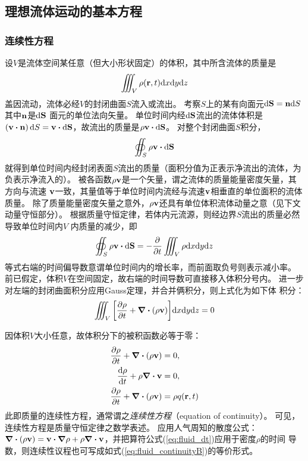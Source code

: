 \documentclass[UTF8]{ctexbook}
\begin{document}
\subsection{理想流体运动的基本方程}
\subsubsection{连续性方程}
设$V$是流体空间某任意（但大小形状固定）的体积，其中所含流体的质量是
$$\iiint_V \rho(\vb{r},t)\dd x \dd y \dd z$$
盖因流动，流体必经$V$的封闭曲面$S$流入或流出。
考察$S$上的某有向面元$\dd \vb{S} = \vb{n} \dd S$其中$\vb{n}$是$\dd \vb{S}$
面元的单位法向矢量。
单位时间内经$\dd \vb{S}$流出的流体体积是$(\vb{v}\vdot \vb{n}) \dd{S}=
\vb{v}\vdot \dd \vb{S}$，故流出的质量是$\rho \vb{v}\vdot \dd \vb{S}$。
对整个封闭曲面$S$积分，
$$\oiint_S \rho\vb{v}\vdot \dd \vb{S}$$
就得到单位时间内经封闭表面$S$流出的质量（面积分值为正表示净流出的流体，为
负表示净流入的）。
被各函数$\rho \vb{v}$是一个矢量，谓之流体的质量能量密度矢量，其方向与流速
$\vb{v}$一致，其量值等于单位时间内流经与流速$\vb{v}$相垂直的单位面积的流体
质量。
除了质量能量密度矢量之意外，$\rho \vb{v}$还具有单位体积流体动量之意（见下文
动量守恒部分）。
根据质量守恒定律，若体内元流源，则经边界$S$流出的质量必然导致单位时间内$V$
内质量的减少，即
$$\oiint_S \rho \vb{v}\vdot \dd{\vb{S}} = -\pdv{t} \iiint_V \rho \dd x\dd
y\dd z$$
等式右端的时间偏导数意谓单位时间内的增长率，而前面取负号则表示减小率。
前已假定，体积$V$在空间固定，故右端的时间导数可直接移入体积分号内。
进一步对左端的封闭曲面积分应用Gauss定理，并合并俩积分，则上式化为如下体
积分：
$$\iiint_V\qty[\pdv{\rho}{t} +\div{(\rho\vb{v})}]\dd x \dd y \dd z=0$$

因体积$V$大小任意，故体积分下的被积函数必等于零：
\begin{subequations}
	\begin{align}
		\pdv{\rho}{t} +\div(\rho\vb{v}) & = 0,\\
		\dv{\rho}{t} + \rho \div\vb{v} &= 0,\label{eq:fluid_continuityB} \\
		\pdv{\rho}{t} + \div (\rho \vb{v}) & = \rho q(\vb{r},t)\label{eq:fluid_continuityC}
	\end{align}
	\label{eq:fluid_continuity}
\end{subequations}
此即质量的连续性方程，通常谓之\emph{连续性方程}（equation of continuity）。
可见，连续性方程是质量守恒定律之数学表述。
应用人气周知的散度公式：$\div (\rho\vb{v}) = \vb{v} \vdot \grad \rho +
\rho \div{\vb{v}}$，并把算符公式(\ref{eq:fluid_dt})应用于密度$\rho$的时间
导数，则连续性议程也可写成如式(\ref{eq:fluid_continuityB})的等价形式。
\end{document}
